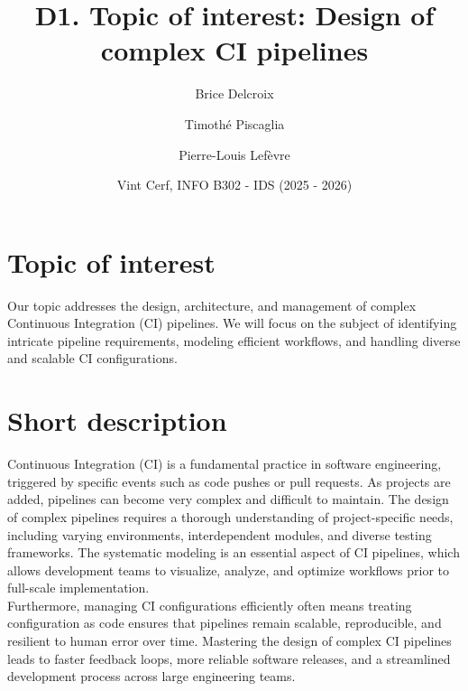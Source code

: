 \documentclass[a4paper,11pt,oneside]{article}
\title{D1. Topic of interest: Design of complex CI pipelines
}
\author{
    Brice Delcroix
    \and Timothé Piscaglia
    \and Pierre-Louis Lefèvre}
\date{
    Vint Cerf, INFO B302 - IDS (2025 - 2026)
}
\begin{document}
\maketitle

\section{Topic of interest}

Our topic addresses the design, architecture, and management of complex Continuous Integration (CI) pipelines. We will focus on the subject of identifying intricate pipeline requirements, modeling efficient workflows, and handling diverse and scalable CI configurations.

\section{Short description}

Continuous Integration (CI) is a fundamental practice in software engineering, triggered by specific events such as code pushes or pull requests. As projects are added, pipelines can become very complex and difficult to maintain. The design of complex pipelines requires a thorough understanding of project-specific needs, including varying environments, interdependent modules, and diverse testing frameworks. The systematic modeling is an essential aspect of CI pipelines, which allows development teams to visualize, analyze, and optimize workflows prior to full-scale implementation. \\

Furthermore, managing CI configurations efficiently often means treating configuration as code ensures that pipelines remain scalable, reproducible, and resilient to human error over time. Mastering the design of complex CI pipelines leads to faster feedback loops, more reliable software releases, and a streamlined development process across large engineering teams.
\end{document}
